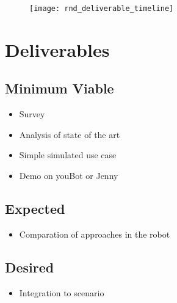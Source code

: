 \documentclass[thesis]{mas_proposal}
\begin{document}
\begin{figure}[h!]
    \texttt{[image: rnd\_deliverable\_timeline]}
    \caption{}
    \label{}
\end{figure}

\section{Deliverables}
\subsection{Minimum Viable}

\begin{itemize}
    \item Survey
    \item Analysis of state of the art
    \item Simple simulated use case
    \item Demo on youBot or Jenny
\end{itemize}

\subsection{Expected}
\begin{itemize}
    \item Comparation of approaches in the robot
\end{itemize}

\subsection{Desired}
\begin{itemize}
    \item Integration to scenario
\end{itemize}


\nocite{*}

\end{document}
